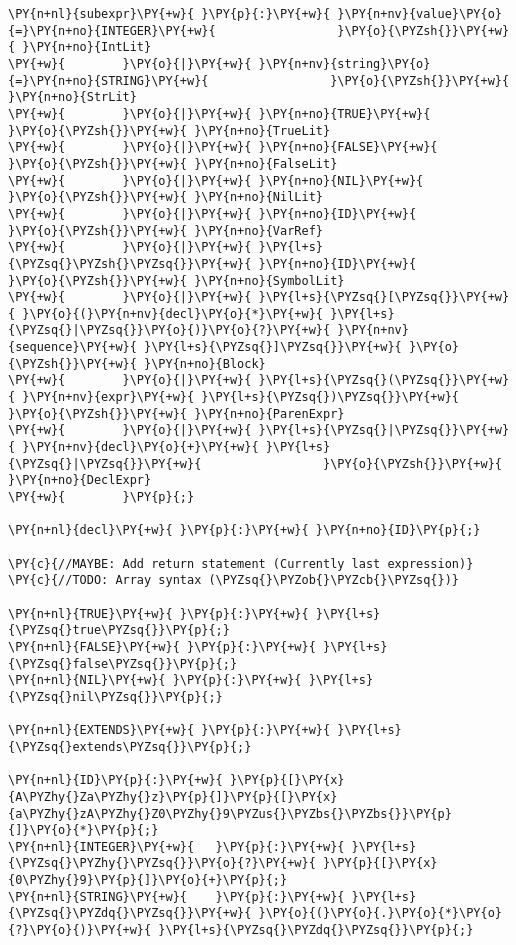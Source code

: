 \begin{Verbatim}[commandchars=\\\{\}]
\PY{n+nl}{subexpr}\PY{+w}{ }\PY{p}{:}\PY{+w}{ }\PY{n+nv}{value}\PY{o}{=}\PY{n+no}{INTEGER}\PY{+w}{                 }\PY{o}{\PYZsh{}}\PY{+w}{ }\PY{n+no}{IntLit}
\PY{+w}{        }\PY{o}{|}\PY{+w}{ }\PY{n+nv}{string}\PY{o}{=}\PY{n+no}{STRING}\PY{+w}{                 }\PY{o}{\PYZsh{}}\PY{+w}{ }\PY{n+no}{StrLit}
\PY{+w}{        }\PY{o}{|}\PY{+w}{ }\PY{n+no}{TRUE}\PY{+w}{                          }\PY{o}{\PYZsh{}}\PY{+w}{ }\PY{n+no}{TrueLit}
\PY{+w}{        }\PY{o}{|}\PY{+w}{ }\PY{n+no}{FALSE}\PY{+w}{                         }\PY{o}{\PYZsh{}}\PY{+w}{ }\PY{n+no}{FalseLit}
\PY{+w}{        }\PY{o}{|}\PY{+w}{ }\PY{n+no}{NIL}\PY{+w}{                           }\PY{o}{\PYZsh{}}\PY{+w}{ }\PY{n+no}{NilLit}
\PY{+w}{        }\PY{o}{|}\PY{+w}{ }\PY{n+no}{ID}\PY{+w}{                            }\PY{o}{\PYZsh{}}\PY{+w}{ }\PY{n+no}{VarRef}
\PY{+w}{        }\PY{o}{|}\PY{+w}{ }\PY{l+s}{\PYZsq{}\PYZsh{}\PYZsq{}}\PY{+w}{ }\PY{n+no}{ID}\PY{+w}{                        }\PY{o}{\PYZsh{}}\PY{+w}{ }\PY{n+no}{SymbolLit}
\PY{+w}{        }\PY{o}{|}\PY{+w}{ }\PY{l+s}{\PYZsq{}[\PYZsq{}}\PY{+w}{ }\PY{o}{(}\PY{n+nv}{decl}\PY{o}{*}\PY{+w}{ }\PY{l+s}{\PYZsq{}|\PYZsq{}}\PY{o}{)}\PY{o}{?}\PY{+w}{ }\PY{n+nv}{sequence}\PY{+w}{ }\PY{l+s}{\PYZsq{}]\PYZsq{}}\PY{+w}{ }\PY{o}{\PYZsh{}}\PY{+w}{ }\PY{n+no}{Block}
\PY{+w}{        }\PY{o}{|}\PY{+w}{ }\PY{l+s}{\PYZsq{}(\PYZsq{}}\PY{+w}{ }\PY{n+nv}{expr}\PY{+w}{ }\PY{l+s}{\PYZsq{})\PYZsq{}}\PY{+w}{                  }\PY{o}{\PYZsh{}}\PY{+w}{ }\PY{n+no}{ParenExpr}
\PY{+w}{        }\PY{o}{|}\PY{+w}{ }\PY{l+s}{\PYZsq{}|\PYZsq{}}\PY{+w}{ }\PY{n+nv}{decl}\PY{o}{+}\PY{+w}{ }\PY{l+s}{\PYZsq{}|\PYZsq{}}\PY{+w}{                 }\PY{o}{\PYZsh{}}\PY{+w}{ }\PY{n+no}{DeclExpr}
\PY{+w}{        }\PY{p}{;}

\PY{n+nl}{decl}\PY{+w}{ }\PY{p}{:}\PY{+w}{ }\PY{n+no}{ID}\PY{p}{;}

\PY{c}{//MAYBE: Add return statement (Currently last expression)}
\PY{c}{//TODO: Array syntax (\PYZsq{}\PYZob{}\PYZcb{}\PYZsq{})}

\PY{n+nl}{TRUE}\PY{+w}{ }\PY{p}{:}\PY{+w}{ }\PY{l+s}{\PYZsq{}true\PYZsq{}}\PY{p}{;}
\PY{n+nl}{FALSE}\PY{+w}{ }\PY{p}{:}\PY{+w}{ }\PY{l+s}{\PYZsq{}false\PYZsq{}}\PY{p}{;}
\PY{n+nl}{NIL}\PY{+w}{ }\PY{p}{:}\PY{+w}{ }\PY{l+s}{\PYZsq{}nil\PYZsq{}}\PY{p}{;}

\PY{n+nl}{EXTENDS}\PY{+w}{ }\PY{p}{:}\PY{+w}{ }\PY{l+s}{\PYZsq{}extends\PYZsq{}}\PY{p}{;}

\PY{n+nl}{ID}\PY{p}{:}\PY{+w}{ }\PY{p}{[}\PY{x}{A\PYZhy{}Za\PYZhy{}z}\PY{p}{]}\PY{p}{[}\PY{x}{a\PYZhy{}zA\PYZhy{}Z0\PYZhy{}9\PYZus{}\PYZbs{}\PYZbs{}}\PY{p}{]}\PY{o}{*}\PY{p}{;}
\PY{n+nl}{INTEGER}\PY{+w}{   }\PY{p}{:}\PY{+w}{ }\PY{l+s}{\PYZsq{}\PYZhy{}\PYZsq{}}\PY{o}{?}\PY{+w}{ }\PY{p}{[}\PY{x}{0\PYZhy{}9}\PY{p}{]}\PY{o}{+}\PY{p}{;}
\PY{n+nl}{STRING}\PY{+w}{    }\PY{p}{:}\PY{+w}{ }\PY{l+s}{\PYZsq{}\PYZdq{}\PYZsq{}}\PY{+w}{ }\PY{o}{(}\PY{o}{.}\PY{o}{*}\PY{o}{?}\PY{o}{)}\PY{+w}{ }\PY{l+s}{\PYZsq{}\PYZdq{}\PYZsq{}}\PY{p}{;}


\end{Verbatim}
